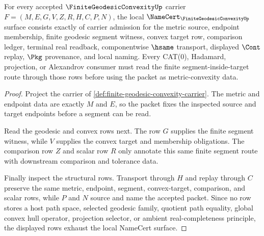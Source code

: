 \begin{theorem}
\label{thm:finite-geodesic-convexity-namecert-obligations}
For every accepted $\FiniteGeodesicConvexityUp$ carrier $F=(M,E,G,V,Z,R,H,C,P,N)$, the local $\NameCert_{\FiniteGeodesicConvexityUp}$ surface consists exactly of carrier admission for the metric source, endpoint membership, finite geodesic segment witness, convex target row, comparison ledger, terminal real readback, componentwise $\hsame$ transport, displayed $\Cont$ replay, $\Pkg$ provenance, and local naming. Every CAT(0), Hadamard, projection, or Alexandrov consumer must read the finite segment-inside-target route through those rows before using the packet as metric-convexity data.
\end{theorem}
\begin{proof}
Project the carrier of \autoref{def:finite-geodesic-convexity-carrier}. The metric and endpoint data are exactly $M$ and $E$, so the packet fixes the inspected source and target endpoints before a segment can be read.

Read the geodesic and convex rows next. The row $G$ supplies the finite segment witness, while $V$ supplies the convex target and membership obligations. The comparison row $Z$ and scalar row $R$ only annotate this same finite segment route with downstream comparison and tolerance data.

Finally inspect the structural rows. Transport through $H$ and replay through $C$ preserve the same metric, endpoint, segment, convex-target, comparison, and scalar rows, while $P$ and $N$ source and name the accepted packet. Since no row stores a host path space, selected geodesic family, quotient path equality, global convex hull operator, projection selector, or ambient real-completeness principle, the displayed rows exhaust the local NameCert surface.
\end{proof}



